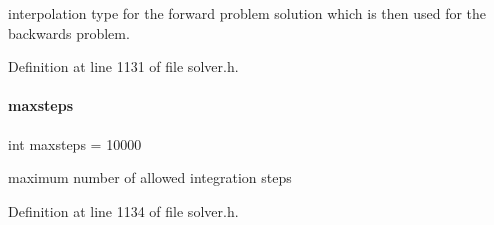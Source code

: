 interpolation type for the forward problem solution which is then used for the backwards problem. 

Definition at line 1131 of file solver.\+h.

\mbox{\label{classamici_1_1_solver_a029415ebe024ac6281fd9f190aefb2ee}} 
\paragraph{\texorpdfstring{maxsteps}{maxsteps}}
{\footnotesize\ttfamily int maxsteps = 10000\hspace{0.3cm}{\ttfamily [protected]}}

maximum number of allowed integration steps 

Definition at line 1134 of file solver.\+h.

